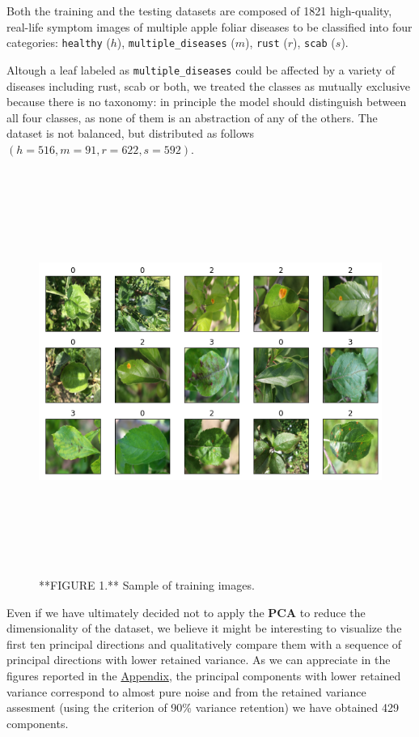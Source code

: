 \documentclass[10pt,]{article}
\begin{document}
Both the training and the testing datasets are composed of 1821
high-quality, real-life symptom images of multiple apple foliar diseases
to be classified into four categories: \texttt{healthy} (\(h\)),
\texttt{multiple\_diseases} (\(m\)), \texttt{rust} (\(r\)),
\texttt{scab} (\(s\)).

Altough a leaf labeled as \texttt{multiple\_diseases} could be affected
by a variety of diseases including rust, scab or both, we treated the
classes as mutually exclusive because there is no taxonomy: in principle
the model should distinguish between all four classes, as none of them
is an abstraction of any of the others. The dataset is not balanced, but
distributed as follows \((h = 516, m = 91, r = 622, s = 592)\).

\begin{figure}

{\centering \includegraphics[width=800px,height=500]{Images/InputImages} 

}

\caption{**FIGURE 1.** Sample of training images.}\label{fig:input-images}
\end{figure}

Even if we have ultimately decided not to apply the \textbf{PCA} to
reduce the dimensionality of the dataset, we believe it might be
interesting to visualize the first ten principal directions and
qualitatively compare them with a sequence of principal directions with
lower retained variance. As we can appreciate in the figures reported in
the \protect\hyperlink{pca}{Appendix}, the principal components with
lower retained variance correspond to almost pure noise and from the
retained variance assesment (using the criterion of 90\% variance
retention) we have obtained 429 components.
\end{document}
